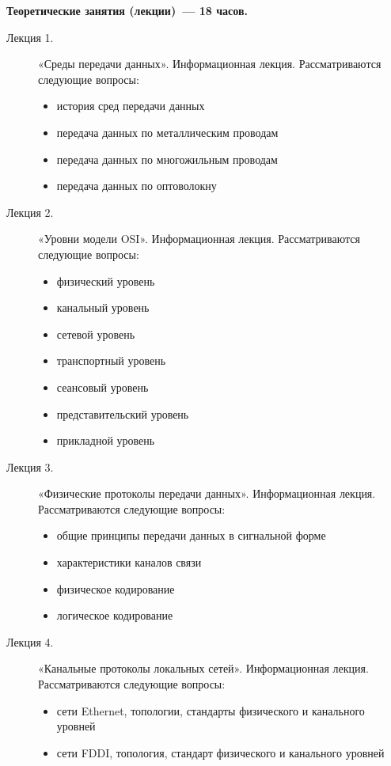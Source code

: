 {\parindent0pt

\textbf{Теоретические занятия (лекции)~— 18 часов.}
\begin{description}
\item[Лекция 1.] «Среды передачи данных». Информационная лекция. Рассматриваются следующие вопросы: \begin{itemize}
\item история сред передачи данных\item передача данных по металлическим проводам\item передача данных по многожильным проводам\item передача данных по оптоволокну
\end{itemize}\item[Лекция 2.] «Уровни модели OSI». Информационная лекция. Рассматриваются следующие вопросы: \begin{itemize}
\item физический уровень\item канальный уровень\item сетевой уровень\item транспортный уровень\item сеансовый уровень\item представительский уровень\item прикладной уровень
\end{itemize}\item[Лекция 3.] «Физические протоколы передачи данных». Информационная лекция. Рассматриваются следующие вопросы: \begin{itemize}
\item общие принципы передачи данных в сигнальной форме\item характеристики каналов связи\item физическое кодирование\item логическое кодирование
\end{itemize}\item[Лекция 4.] «Канальные протоколы локальных сетей». Информационная лекция. Рассматриваются следующие вопросы: \begin{itemize}
\item сети Ethernet, топологии, стандарты физического и канального уровней\item сети FDDI, топология, стандарт физического и канального уровней
\end{itemize}
\end{description}




}
